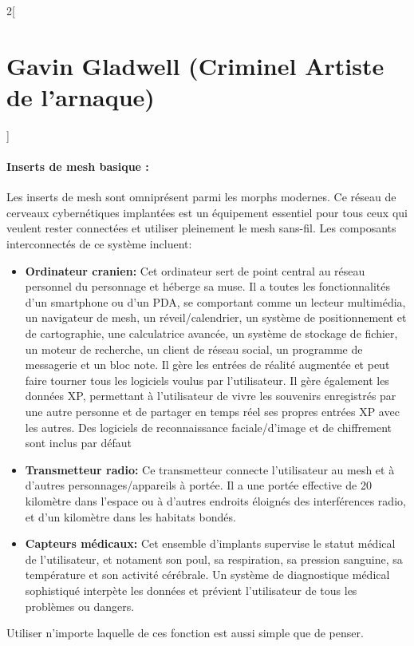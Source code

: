 \documentclass[a4paper,9pt]{article}
\begin{document}
\begin{multicols}{2}[\section*{Gavin Gladwell (Criminel Artiste de l'arnaque)}]
\paragraph{Inserts de mesh basique :} 
Les inserts de mesh sont omniprésent parmi les morphs modernes. Ce réseau de
cerveaux cybernétiques implantées est un équipement essentiel pour tous ceux
qui veulent rester connectées et utiliser pleinement le mesh sans-fil. Les
composants interconnectés de ce système incluent: 

\begin{itemize}
   \item \textbf{Ordinateur cranien:} Cet ordinateur sert de point central au
      réseau personnel du personnage et héberge sa muse. Il a toutes
      les fonctionnalités d'un smartphone ou d'un PDA, se comportant comme un
      lecteur multimédia, un navigateur de mesh, un réveil/calendrier, un
      système de positionnement et de cartographie, une calculatrice avancée,
      un système de stockage de fichier, un moteur de recherche, un client de
      réseau social, un programme de messagerie et un bloc note. Il gère les
      entrées de réalité augmentée et peut faire tourner tous les logiciels
      voulus par l'utilisateur. Il gère également les données XP, permettant à
      l'utilisateur de vivre les souvenirs enregistrés par une autre personne et
      de partager en temps réel ses propres entrées XP avec les autres. Des
      logiciels de reconnaissance faciale/d'image et de chiffrement
      sont inclus par défaut
   \item \textbf{Transmetteur radio:} Ce transmetteur connecte l'utilisateur au
      mesh et à d'autres personnages/appareils à portée. Il a une portée
      effective de 20 kilomètre dans l'espace ou à d'autres endroits éloignés
      des interférences radio, et d'un kilomètre dans les habitats bondés.
   \item \textbf{Capteurs médicaux:} Cet ensemble d'implants supervise le
      statut médical de l'utilisateur, et notament son poul, sa respiration, sa
      pression sanguine, sa température et son activité cérébrale. Un système de
      diagnostique médical sophistiqué interpète les données et prévient
      l'utilisateur de tous les problèmes ou dangers.
\end{itemize} 

Utiliser n'importe laquelle de ces fonction est aussi simple que de penser.


\end{multicols}
\end{document}
